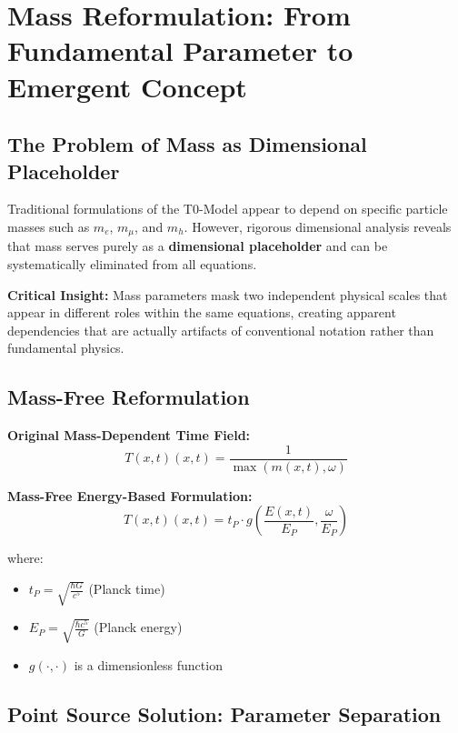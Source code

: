 \documentclass[12pt,a4paper]{report}
\newcommand{\Tfield}{T(x,t)}  %
\begin{document}
\section*{Mass Reformulation: From Fundamental Parameter to Emergent Concept}

\subsection*{The Problem of Mass as Dimensional Placeholder}

Traditional formulations of the T0-Model appear to depend on specific particle masses such as $m_e$, $m_\mu$, and $m_h$. However, rigorous dimensional analysis reveals that mass serves purely as a \textbf{dimensional placeholder} and can be systematically eliminated from all equations.

\textbf{Critical Insight:} Mass parameters mask two independent physical scales that appear in different roles within the same equations, creating apparent dependencies that are actually artifacts of conventional notation rather than fundamental physics.

\subsection*{Mass-Free Reformulation}

\textbf{Original Mass-Dependent Time Field:}
\begin{equation}
	\Tfield(x,t) = \frac{1}{\max(m(x,t), \omega)}
\end{equation}

\textbf{Mass-Free Energy-Based Formulation:}
\begin{equation}
	\boxed{\Tfield(x,t) = t_P \cdot g\left(\frac{E(x,t)}{E_P}, \frac{\omega}{E_P}\right)}
\end{equation}

where:
\begin{itemize}
	\item $t_P = \sqrt{\frac{\hbar G}{c^5}}$ (Planck time)
	\item $E_P = \sqrt{\frac{\hbar c^5}{G}}$ (Planck energy)
	\item $g(\cdot,\cdot)$ is a dimensionless function
\end{itemize}

\subsection*{Point Source Solution: Parameter Separation}
\end{document}
